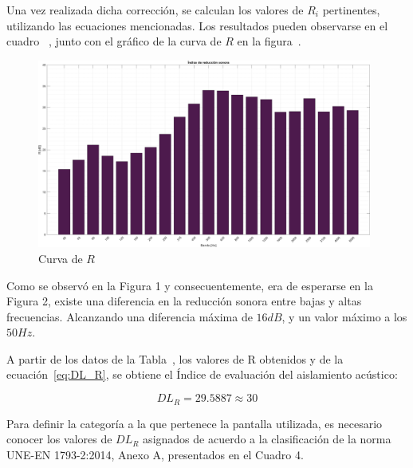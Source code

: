 \par Una vez realizada dicha corrección, se calculan los valores de $R_i$ pertinentes, utilizando las ecuaciones mencionadas. Los resultados pueden observarse en el cuadro~ , junto con el gráfico de la curva de $R$ en la figura~.



\begin{figure}[H]
	\centering
	\includegraphics[width=0.98\textwidth]{./img/Indice_reduccion_sonora_bars.png}
	\caption{Curva de $R$}
	\label{fig::indice_reduccion_sonora}
\end{figure}


\par Como se observó en la Figura 1 y consecuentemente, era de esperarse en la Figura 2, existe una diferencia en la reducción sonora entre bajas y altas frecuencias. Alcanzando una diferencia máxima de $16dB$, y un valor máximo a los $50Hz$.

\par A partir de los datos de la Tabla~, los valores de R obtenidos y de la ecuación~\eqref{eq:DL_R}, se obtiene el Índice de evaluación del aislamiento acústico:

\begin{equation*}
    \boxed{DL_R =   29.5887 \approx 30}
\end{equation*}

\par Para definir la categoría a la que pertenece la pantalla utilizada, es necesario conocer los valores de $DL_R$ asignados de acuerdo a la clasificación de la norma UNE-EN 1793-2:2014, Anexo A, presentados en el Cuadro 4. 

